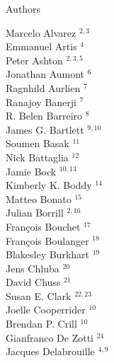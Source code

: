 \documentclass[PICOAPC.tex]{subfiles}
\begin{document}
\large  {\centerline {Authors}}
%
\setlength{\columnsep}{7pt}
\footnotesize {
\begin{multicols}{4}
Marcelo Alvarez $^{2,3}$                 \\
Emmanuel Artis $^{4}$                  \\
Peter Ashton $^{2,3,5}$                    \\
Jonathan Aumont $^{6}$                 \\
Ragnhild Aurlien $^{7}$                \\
Ranajoy Banerji $^{7}$                 \\
R. Belen Barreiro $^{8}$               \\
James G. Bartlett $^{9,10}$               \\
Soumen Basak $^{11}$                    \\
Nick Battaglia $^{12}$                  \\
Jamie Bock $^{10,13}$                      \\
Kimberly K. Boddy $^{14}$               \\
Matteo Bonato $^{15}$                   \\
Julian Borrill $^{2,16}$                  \\
Fran\c{c}ois Bouchet $^{17}$            \\
Fran\c{c}ois Boulanger $^{18}$          \\
Blakesley Burkhart $^{19}$              \\
Jens Chluba $^{20}$                     \\
David Chuss $^{21}$                     \\
Susan E. Clark $^{22,23}$                  \\
Joelle Cooperrider $^{10}$              \\
Brendan P. Crill $^{10}$                \\
Gianfranco De Zotti $^{24}$             \\
Jacques Delabrouille $^{4,9}$            \\

\end{multicols}}
\end{document}
